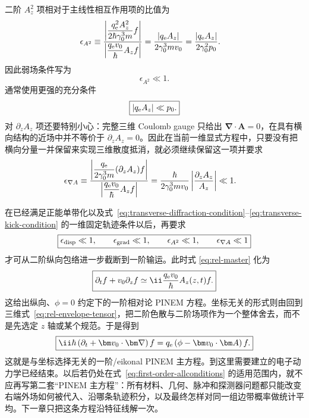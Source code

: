 二阶 $A_z^2$ 项相对于主线性相互作用项的比值为
\begin{align}
 \epsilon_{A^2}
 &\equiv
 \frac{\left|\dfrac{q_{\rm e}^2A_z^2}{2\hbar\gamma_0^3m}f\right|}
 {\left|\dfrac{q_{\rm e}v_0}{\hbar}A_zf\right|}
 =\frac{|q_{\rm e}A_z|}{2\gamma_0^3mv_0}
 =\frac{|q_{\rm e}A_z|}{2\gamma_0^2p_0}.
 \label{eq:eps-A2}
\end{align}
因此弱场条件写为
\begin{equation}
 \boxed{\epsilon_{A^2}\ll1.}
 \label{eq:first-order-gradient-condition}
\end{equation}
通常使用更强的充分条件
\begin{equation}
 \boxed{|q_{\rm e}A_z|\ll p_0.}
 \label{eq:weak-field-condition}
\end{equation}
对 $\partial_zA_z$ 项还要特别小心：完整三维 Coulomb gauge 只给出 $\bm\nabla\cdot\bm A=0$，在具有横向结构的近场中并不等价于 $\partial_zA_z=0$。因此在当前一维显式方程中，只要没有把横向分量一并保留来实现三维散度抵消，就必须继续保留这一项并要求
\begin{align}
 \epsilon_{\nabla A}
 &\equiv
 \frac{\left|\dfrac{q_{\rm e}}{2\gamma_0^3m}(\partial_zA_z)f\right|}
 {\left|\dfrac{q_{\rm e}v_0}{\hbar}A_zf\right|}
 =\frac{\hbar}{2\gamma_0^3mv_0}
 \left|\frac{\partial_zA_z}{A_z}\right|
 \ll1.
 \label{eq:eps-div}
\end{align}

在已经满足正能单带化以及式~\eqref{eq:transverse-diffraction-condition}--\eqref{eq:transverse-kick-condition} 的一维固定轨迹条件以后，再要求
\begin{equation}
 \boxed{
 \epsilon_{\rm disp}\ll1,
 \qquad
 \epsilon_{\rm grad}\ll1,
 \qquad
 \epsilon_{A^2}\ll1,
 \qquad
 \epsilon_{\nabla A}\ll1}
 \label{eq:first-order-allconditions}
\end{equation}
才可从二阶纵向包络进一步截断到一阶输运。此时式 \eqref{eq:rel-master} 化为
\begin{equation}
 \boxed{
 \partial_t f
 +v_0\partial_z f
 \simeq
 \ii\frac{q_{\rm e}v_0}{\hbar}A_z(z,t)f.}
 \label{eq:first-order-pinem}
\end{equation}
这给出纵向、$\phi=0$ 约定下的一阶相对论 PINEM 方程。坐标无关的形式则由回到三维式~\eqref{eq:rel-envelope-tensor}，把二阶色散与二阶场项作为一个整体舍去，而不是先选定 $z$ 轴或某个规范。于是得到
\begin{equation}
\boxed{
\ii\hbar\left(\partial_t+\bm v_0\cdot\bm\nabla\right)f
=q_{\rm e}\left(\phi-\bm v_0\cdot\bm A\right)f.}
\label{eq:eikonal-master-general}
\end{equation}
这就是与坐标选择无关的一阶/eikonal PINEM 主方程。到这里需要建立的电子动力学已经结束。以后若仍处在式~\eqref{eq:first-order-allconditions} 的适用范围内，就不应再写第二套“PINEM 主方程”：所有材料、几何、脉冲和探测器问题都只能改变右端外场如何被代入、沿哪条轨迹积分，以及最终怎样对同一组边带概率做统计平均。下一章只把这条方程沿特征线解一次。


